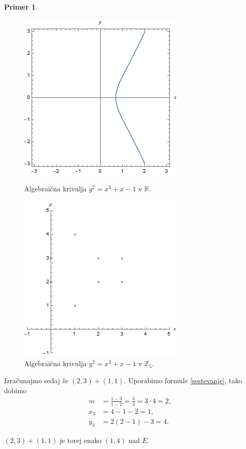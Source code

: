 \documentclass[12pt,a4paper,twoside]{article}
\theoremstyle{definition} %
\newtheorem{primer}[definicija]{Primer}
\theoremstyle{plain} %
\numberwithin{equation}{section}  %
\newcommand{\R}{\mathbb R}
\newcommand{\Z}{\mathbb Z}
\begin{document}
\begin{primer}
\begin{figure}[ht]
  \centering
\begin{minipage}{.5\textwidth}
  \includegraphics[scale = 0.5]{images/krivuljamod0.png}
  \caption[Primer algebraične krivulje.]{Algebraična krivulja $y^2 = x^3+x-1$ v $\R$.}
  \label{fig:krivuljamod0}
\end{minipage}%
\begin{minipage}{.5\textwidth}
\centering
\includegraphics[scale=0.5]{images/krivuljamod1.png}
\caption[Presek algebraične krivulje z ravnino $z=1$.]{Algebraična krivulja $y^2 = x^3+x-1$ v $\Z_5$.}
\label{fig:krivuljamod1}
\end{minipage}
\end{figure}

Izračunajmo sedaj še $(2,3)+(1,1)$. Uporabimo formule \ref{sestevanje}, tako dobimo
\begin{align}
m &{}= \frac{1-3}{1-2} = \frac{3}{4} = 3\cdot 4 = 2, \nonumber \\
x_3 &{} = 4-1-2 = 1, \nonumber \\
y_3 &{} = 2(2-1)-3 = 4. \nonumber
\end{align}

$(2,3)+(1,1)$ je torej enako $(1,4)$ nad $E$.

\end{primer}
\end{document}
